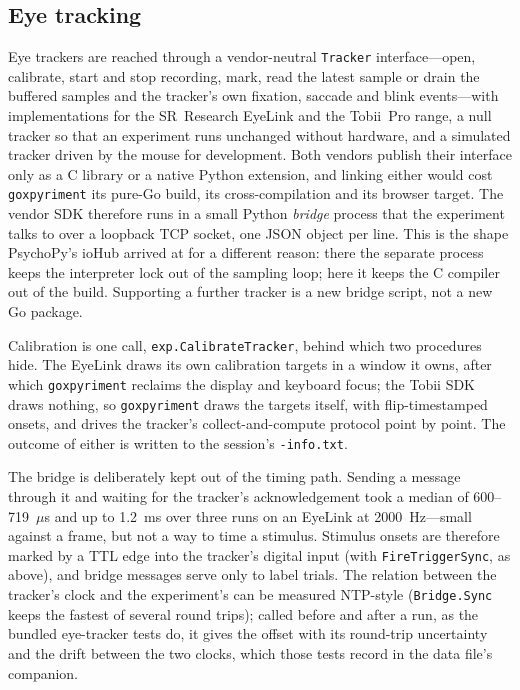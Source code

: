 \documentclass[doc,a4paper,floatsintext]{apa7}
\begin{document}
\subsection{Eye tracking}\label{eyetracking}

Eye trackers are reached through a vendor-neutral \texttt{Tracker}
interface---open, calibrate, start and stop recording, mark, read the
latest sample or drain the buffered samples and the tracker's own
fixation, saccade and blink events---with implementations for the
SR~Research EyeLink and the Tobii~Pro range, a null tracker so that an
experiment runs unchanged without hardware, and a simulated tracker
driven by the mouse for development. Both vendors publish their
interface only as a C library or a native Python extension, and
linking either would cost \texttt{goxpyriment} its pure-Go build,
its cross-compilation and its browser target. The vendor SDK therefore
runs in a small Python \emph{bridge} process that the experiment talks
to over a loopback TCP socket, one JSON object per line. This is the
shape PsychoPy's ioHub arrived at for a different reason: there the
separate process keeps the interpreter lock out of the sampling loop;
here it keeps the C compiler out of the build. Supporting a further
tracker is a new bridge script, not a new Go package.

Calibration is one call, \texttt{exp.CalibrateTracker}, behind which
two procedures hide. The EyeLink draws its own calibration targets in
a window it owns, after which \texttt{goxpyriment} reclaims the
display and keyboard focus; the Tobii SDK draws nothing, so
\texttt{goxpyriment} draws the targets itself, with flip-timestamped
onsets, and drives the tracker's collect-and-compute protocol point
by point. The outcome of either is written to the session's
\texttt{-info.txt}.

The bridge is deliberately kept out of the timing path. Sending a
message through it and waiting for the tracker's acknowledgement took
a median of 600--719~$\mu$s and up to 1.2~ms over three runs on an
EyeLink at 2000~Hz---small against a frame, but not a way to time a
stimulus. Stimulus onsets are therefore marked by a TTL edge into the
tracker's digital input (with \texttt{FireTriggerSync}, as above),
and bridge messages serve only to label trials. The relation between
the tracker's clock and the experiment's can be measured NTP-style
(\texttt{Bridge.Sync} keeps the fastest of several round trips); called
before and after a run, as the bundled eye-tracker tests do, it gives the
offset with its round-trip uncertainty and the drift between the two clocks,
which those tests record in the data file's companion.
\end{document}
